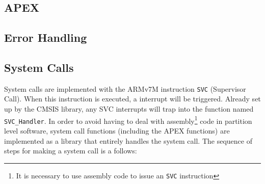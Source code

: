\subsection{APEX}

\subsection{Error Handling}

\subsection{System Calls}
System calls are implemented with the ARMv7M instruction \texttt{SVC} (Supervisor
Call). When this instruction is executed, a interrupt will be triggered. Already
set up by the CMSIS library, any SVC interrupts will trap into the function
named \texttt{SVC\_Handler}.
In order to avoid having to deal with assembly\footnote{It is necessary to use
assembly code to issue an \texttt{SVC} instruction} code in partition level
software, system call functions (including the APEX functions) are implemented
as a library that entirely handles the system call.
The sequence of steps for making a system call is a follows:\\


